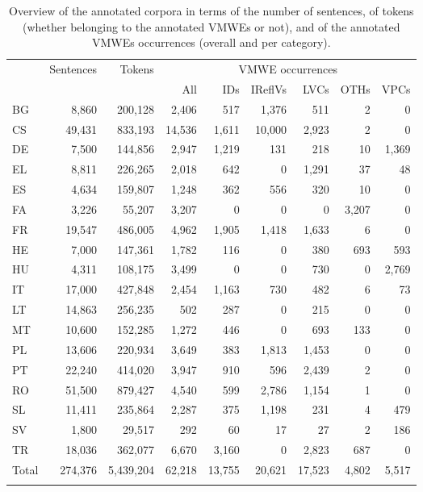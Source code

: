\documentclass[output=paper,
modfonts,
]{langscibook}
\begin{document}
\begin{table}[htp]
\centering
\setlength{\tabcolsep}{0.9mm}

\begin{tabularx}{.95\textwidth}{lrrrrrrrr}
\lsptoprule
\multirow{2}{*}{Language} & \multirow{2}{*}{Sentences} & \multirow{2}{*}{Tokens} & \multicolumn{6}{c}{VMWE occurrences} \\\cmidrule{4-9}
& & & All & IDs & IReflVs & LVCs & OTHs & VPCs \\
\midrule
BG & 8,860 & 200,128 & 2,406 & 517 & 1,376 & 511 & 2 & 0 \\
CS & 49,431 & 833,193 & 14,536 & 1,611 & 10,000 & 2,923 & 2 & 0 \\
DE & 7,500 & 144,856 & 2,947 & 1,219 & 131 & 218 & 10 & 1,369 \\
EL & 8,811 & 226,265 & 2,018 & 642 & 0 & 1,291 & 37 & 48 \\
ES & 4,634 & 159,807 & 1,248 & 362 & 556 & 320 & 10 & 0 \\
FA & 3,226 & 55,207 & 3,207 & 0 & 0 & 0 & 3,207 & 0 \\
FR & 19,547 & 486,005 & 4,962 & 1,905 & 1,418 & 1,633 & 6 & 0 \\
HE & 7,000 & 147,361 & 1,782 & 116 & 0 & 380 & 693 & 593 \\
HU & 4,311 & 108,175 & 3,499 & 0 & 0 & 730 & 0 & 2,769 \\
IT & 17,000 & 427,848 & 2,454 & 1,163 & 730 & 482  & 6 & 73 \\
LT & 14,863 & 256,235 & 502 & 287 & 0 & 215 & 0 & 0 \\
MT & 10,600 & 152,285 & 1,272 & 446 & 0 & 693 & 133 & 0 \\
PL & 13,606 & 220,934 & 3,649 & 383 & 1,813 & 1,453 & 0 & 0 \\
PT & 22,240 & 414,020 & 3,947 & 910 & 596 & 2,439  & 2 & 0 \\
RO & 51,500 & 879,427 & 4,540 & 599 & 2,786 & 1,154 & 1 & 0 \\
SL & 11,411 & 235,864 & 2,287 & 375 & 1,198 & 231 & 4 & 479 \\
SV & 1,800 & 29,517 & 292 & 60 & 17 & 27 & 2 & 186 \\
TR & 18,036 & 362,077 & 6,670 & 3,160 & 0 & 2,823 & 687 & 0 \\
\midrule
Total & 274,376 & 5,439,204 & 62,218 & 13,755 & 20,621 & 17,523 & 4,802 & 5,517 \\
\lspbottomrule       
\end{tabularx}
\caption{Overview of the annotated corpora in terms of the number of sentences, of tokens (whether belonging to the annotated VMWEs or not), and of the annotated VMWEs occurrences (overall and per category).}\label{tab:corpora-overview}
\end{table}
\end{document}
